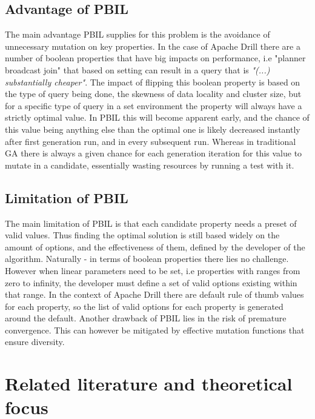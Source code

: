 \documentclass[a4paper,english]{report}
\begin{document}
				\subsection{Advantage of PBIL}
				The main advantage PBIL supplies for this problem is the avoidance of unnecessary mutation on key properties. In the case of Apache Drill there are a number of boolean properties that have big impacts on performance, i.e "planner broadcast join" that based on setting can result in a query that is \textit{"(...) substantially cheaper"}\cite{joinplanning}. The impact of flipping this boolean property is based on the type of query being done, the skewness of data locality and cluster size, but for a specific type of query in a set environment the property will always have a strictly optimal value. In PBIL this will become apparent early, and the chance of this value being anything else than the optimal one is likely decreased instantly after first generation run, and in every subsequent run. Whereas in traditional GA there is always a given chance for each generation iteration for this value to mutate in a candidate, essentially wasting resources by running a test with it.
				\subsection{Limitation of PBIL}
				The main limitation of PBIL is that each candidate property needs a preset of valid values. Thus finding the optimal solution is still based widely on the amount of options, and the effectiveness of them, defined by the developer of the algorithm. Naturally - in terms of boolean properties there lies no challenge. However when linear parameters need to be set, i.e properties with ranges from zero to infinity, the developer must define a set of valid options existing within that range. In the context of Apache Drill there are default rule of thumb values for each property, so the list of valid options for each property is generated around the default.
				Another drawback of PBIL lies in the risk of premature convergence. This can however be mitigated by effective mutation functions that ensure diversity.
				
		
	\section{Related literature and theoretical focus}
\end{document}
